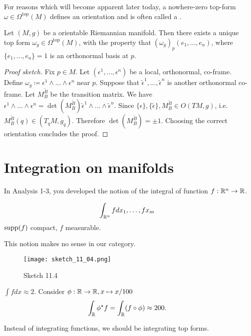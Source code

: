 For reasons which will become apparent later today, a nowhere-zero top-form \(\omega\in\Omega^{\text{top}}(M)\)
defines an orientation and is often called a .

\begin{lemma}\label{lem:11.5}
    Let \((M,g)\) be a orientable Riemannian manifold. Then there exists a unique top form 
    \(\omega_g\in\Omega^{\text{top}}(M)\), with the property that \((\omega_g)_p(e_1,\dots,e_n)\), where \(\{e_1,\dots,e_n\}=1\) is an orthonormal basis at \(p\).
\end{lemma}

\begin{proof}[Proof sketch]
    Fix \(p\in M\). Let \((\epsilon^1,\dots,\epsilon^n)\) be a local, orthonormal, co-frame. Define 
    \(\omega_g\coloneqq \epsilon^1\wedge\dots\wedge \epsilon^n\) near \(p\). Suppose that 
    \(\tilde{\epsilon}^1,\dots,\tilde{\epsilon}^n\) is another orthonormal co-frame. Let \(M_{B}^{\tilde{B}}\)
    be the transition matrix. We have \(\epsilon^{1}\wedge \dots\wedge \epsilon^n=\det(M_{B}^{\tilde{B}})\tilde{\epsilon}^1\wedge\dots\wedge\tilde{\epsilon}^n\). Since 
    \(\{\epsilon\},\{\tilde{\epsilon}\},M_B^{\tilde{B}}\in O(TM,g)\), i.e. \(M_B^{\tilde{B}}(q)\in (T_q M, g_q)\).
    Therefore \(\det(M_{B}^{\tilde{B}})=\pm1\). Choosing the correct orientation concludes the proof.
\end{proof}

\section{Integration on manifolds}

In Analysis 1-3, you developed the notion of the integral of function \(f:\mathbb{R}^n\to \mathbb{R}\).

\[\int_{\mathbb{R}^n} fdx_1,\dots,fx_m\]
\(\text{supp}(f)\) compact, \(f\) measurable.

 This notion makes no sense in our category.

\begin{example}
    \begin{figure}[H]\label{fig:11.4}
        \centering
        \texttt{[image: sketch\_11\_04.png]}
        \caption{Sketch 11.4}
    \end{figure}
    \(\int fdx\approx 2\). Consider \(\phi:\mathbb{R}\to\mathbb{R},x\mapsto x/100\)
    \[\int_{\mathbb{R}} \phi^\star f=\int_{\mathbb{R}} (f\circ \phi)\approx 200.\]
\end{example}
 Instead of integrating functions, we should be integrating top forms.

